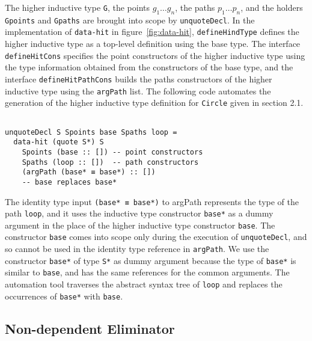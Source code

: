 \documentclass[sigplan,10pt]{acmart}
\begin{document}
The higher inductive type \texttt{G}, the points $g_1 \ldots g_n$, the paths $p_1 \ldots p_n$, and the holders \texttt{Gpoints} and \texttt{Gpaths} are brought into scope by {\tt unquoteDecl}. In the implementation of {\tt data-hit} in figure~\ref{fig:data-hit}, {\tt defineHindType} defines the higher inductive type as a top-level definition using the base type. The interface {\tt defineHitCons} specifies the point constructors of the higher inductive type using the type information obtained from the constructors of the base type, and the interface {\tt defineHitPathCons} builds the paths constructors of the higher inductive type using the {\tt argPath} list. The following code automates the generation of the higher inductive type definition for {\tt Circle} given in section 2.1.
\begin{center}
\begingroup
\begin{BVerbatim}

unquoteDecl S Spoints base Spaths loop =
  data-hit (quote S*) S
    Spoints (base :: []) -- point constructors
    Spaths (loop :: [])  -- path constructors
    (argPath (base* ≡ base*) :: []) 
    -- base replaces base*

\end{BVerbatim}
\endgroup
\end{center}

The identity type input {\tt (base* ≡ base*)} to argPath represents the type of the path {\tt loop}, and it uses the inductive type constructor {\tt base*} as a dummy argument in the place of the higher inductive type constructor {\tt base}. The constructor {\tt base} comes into scope only during the execution of {\tt unquoteDecl}, and so cannot be used in the identity type reference in {\tt argPath}. We use the constructor {\tt base*} of type {\tt S*} as dummy argument because the type of {\tt base*} is similar to {\tt base}, and has the same references for the common arguments. The automation tool traverses the abstract syntax tree of {\tt loop} and replaces the occurrences of {\tt base*} with {\tt base}.

\subsection{Non-dependent Eliminator}
\label{sec:sec4.2}
\end{document}

